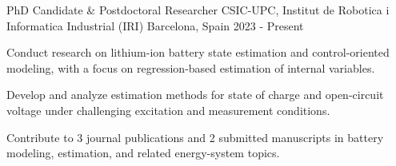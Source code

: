\cventry
  {PhD Candidate \& Postdoctoral Researcher}
  {CSIC-UPC, Institut de Robotica i Informatica Industrial (IRI)}
  {Barcelona, Spain}
  {2023 - Present}
  {
    \begin{cvitems}
      \item {Conduct research on lithium-ion battery state estimation and control-oriented modeling, with a focus on regression-based estimation of internal variables.}
      \item {Develop and analyze estimation methods for state of charge and open-circuit voltage under challenging excitation and measurement conditions.}
      \item {Contribute to 3 journal publications and 2 submitted manuscripts in battery modeling, estimation, and related energy-system topics.}
    \end{cvitems}
  }